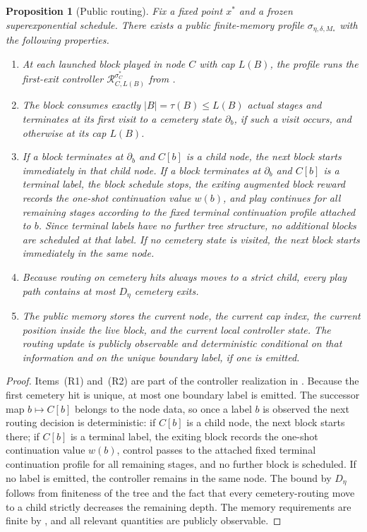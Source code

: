 \documentclass[12pt]{article}
\newtheorem{proposition}[theorem]{Proposition}
\theoremstyle{definition}
\newcommand{\1}{\mathbf{1}}
\begin{document}
\begin{proposition}[Public routing]
\label{prop:public-routing}
Fix a fixed point $x^*$ and a frozen superexponential schedule. There exists a
public finite-memory profile $\sigma_{\eta,\delta,M_*}$ with the following
properties.
\begin{enumerate}[label=\textnormal{(R\arabic*)},leftmargin=2.8em]
\item At each launched block played in node $C$ with cap $L(B)$, the profile runs
the first-exit controller $\mathcal R_{C,L(B)}^{\sigma_C^*}$ from
.
\item The block consumes exactly $|B|=\tau(B)\le L(B)$ actual stages and
terminates at its first visit to a cemetery state $\partial_b$, if such a visit
occurs, and otherwise at its cap $L(B)$.
\item If a block terminates at $\partial_b$ and $C[b]$ is a child node, the next
block starts immediately in that child node. If a block terminates at
$\partial_b$ and $C[b]$ is a terminal label, the block schedule stops, the
exiting augmented block reward records the one-shot continuation value $w(b)$,
and play continues for all remaining stages according to the fixed terminal
continuation profile attached to $b$. Since terminal labels have no further tree
structure, no additional blocks are scheduled at that label. If no cemetery
state is visited, the next block starts immediately in the same node.
\item Because routing on cemetery hits always moves to a strict child, every play
path contains at most $D_\eta$ cemetery exits.
\item The public memory stores the current node, the current cap index, the
current position inside the live block, and the current local controller state.
The routing update is publicly observable and deterministic conditional on that
information and on the unique boundary label, if one is emitted.
\end{enumerate}
\end{proposition}

\begin{proof}
Items~(R1) and~(R2) are part of the controller realization in
. Because the first cemetery hit is unique, at most one
boundary label is emitted. The successor map $b\mapsto C[b]$ belongs to the node
data, so once a label $b$ is observed the next routing decision is deterministic:
if $C[b]$ is a child node, the next block starts there; if $C[b]$ is a terminal
label, the exiting block records the one-shot continuation value $w(b)$, control
passes to the attached fixed terminal continuation profile for all remaining
stages, and no further block is scheduled. If no label is emitted, the
controller remains in the same node. The bound by $D_\eta$ follows from
finiteness of the tree and the fact that every cemetery-routing move to a child
strictly decreases the remaining depth. The memory requirements are finite by
, and all relevant quantities are publicly observable.
\end{proof}
\end{document}
